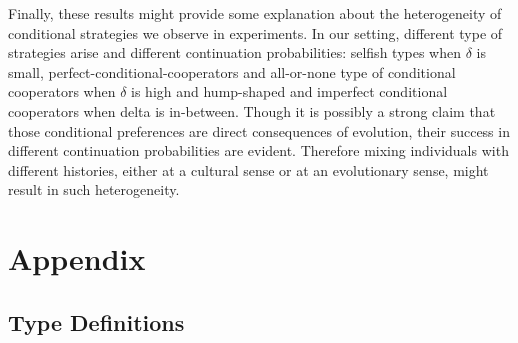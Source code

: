 \documentclass[12pt]{article}
\begin{document}
Finally, these results might provide some explanation about the heterogeneity of conditional strategies we observe in experiments. In our setting, different type of strategies arise and different continuation probabilities: selfish types when $\delta$ is small, perfect-conditional-cooperators and all-or-none type of conditional cooperators when $\delta$ is high and  hump-shaped and imperfect conditional cooperators when delta is in-between. Though it is possibly a strong claim that those conditional preferences are direct consequences of evolution, their success in different continuation probabilities are evident. Therefore mixing individuals with different histories, either at a cultural sense or at an evolutionary sense, might result in such heterogeneity. 


\newpage
\section*{Appendix}
\label{chap:appx-evo}

\subsection*{Type Definitions}
\end{document}
